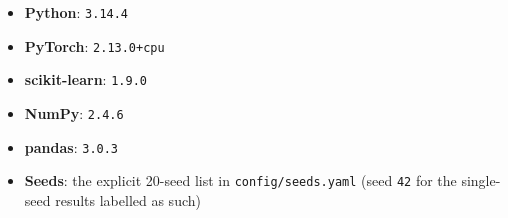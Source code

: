 \begin{itemize}
  \item \textbf{Python}: \texttt{3.14.4}
  \item \textbf{PyTorch}: \texttt{2.13.0+cpu}
  \item \textbf{scikit-learn}: \texttt{1.9.0}
  \item \textbf{NumPy}: \texttt{2.4.6}
  \item \textbf{pandas}: \texttt{3.0.3}
  \item \textbf{Seeds}: the explicit 20-seed list in \texttt{config/seeds.yaml} (seed \texttt{42} for the single-seed results labelled as such)
\end{itemize}
